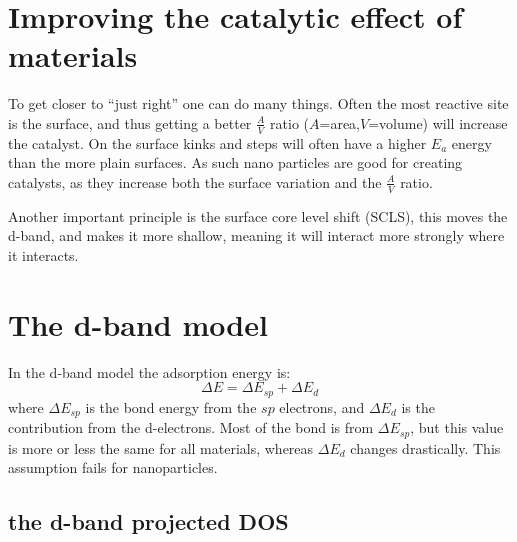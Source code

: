 \documentclass[article,oneside]{memoir}
\begin{document}

\chapter{Improving the catalytic effect of materials}
To get closer to ``just right'' one can do many things. Often the most reactive site is the surface, and thus getting a better $\frac{A}{V}$ ratio ($A$=area,$V$=volume) will increase the catalyst. On the surface kinks and steps will often have a higher $E_{a}$ energy than the more plain surfaces. As such nano particles are good for creating catalysts, as they increase both the surface variation and the $\frac{A}{V}$ ratio.

Another important principle is the surface core level shift (SCLS), this moves the d-band, and makes it more shallow, meaning it will interact more strongly where it interacts.
\chapter{The d-band model}
In the d-band model the adsorption energy is: 
\begin{equation*}
        \Delta E=\Delta E_{sp}+\Delta E_{d}
\end{equation*}
where $\Delta E_{sp}$ is the bond energy from the $sp$ electrons, and $\Delta E_{d}$ is the contribution from the d-electrons. Most of the bond is from $\Delta E_{sp}$, but this value is more or less the same for all materials, whereas $\Delta E_{d}$ changes drastically. This assumption fails for nanoparticles.

\section{the d-band projected DOS}
\end{document}
